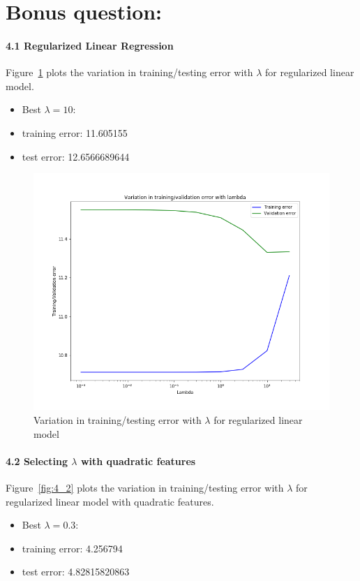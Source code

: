 \documentclass[english,11pt]{article}
\begin{document}
\part*{Bonus question:}
\subsection*{ 4.1 Regularized Linear Regression}
Figure~\ref{fig:4_1}  plots the variation in training/testing error with $\lambda$ for regularized linear model.
\begin{itemize}
\item Best $\lambda=10$:
\item training error: 11.605155
\item test error: 12.6566689644
\end{itemize}

\begin{figure}[ht]
\centering
\includegraphics[width=.5\textwidth]{../hw1/part2/fig4_linear_lambda_10.png}
\caption{Variation in training/testing error with $\lambda$ for regularized linear model}
\label{fig:4_1}
\end{figure}



\subsection*{ 4.2 Selecting $\lambda$ with quadratic features}
Figure~\ref{fig:4_2} plots the variation in training/testing error with $\lambda$ for regularized linear model with quadratic features.
\begin{itemize}
\item Best $\lambda=0.3$:
\item training error:  4.256794
\item test error: 4.82815820863
\end{itemize}
\end{document}
